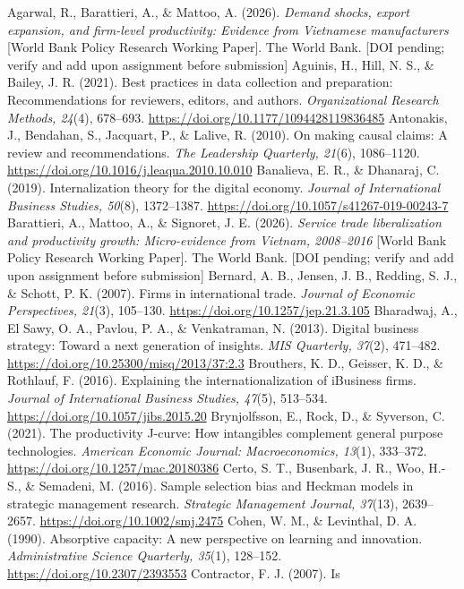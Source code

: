 \documentclass[12pt,a4paper]{article}
\begin{document}
Agarwal, R., Barattieri, A., \& Mattoo, A. (2026). \emph{Demand shocks,
export expansion, and firm-level productivity: Evidence from Vietnamese
manufacturers} {[}World Bank Policy Research Working Paper{]}. The World
Bank. {[}DOI pending; verify and add upon assignment before
submission{]} Aguinis, H., Hill, N. S., \& Bailey, J. R. (2021). Best
practices in data collection and preparation: Recommendations for
reviewers, editors, and authors. \emph{Organizational Research Methods,
24}(4), 678--693. \url{https://doi.org/10.1177/1094428119836485}
Antonakis, J., Bendahan, S., Jacquart, P., \& Lalive, R. (2010). On
making causal claims: A review and recommendations. \emph{The Leadership
Quarterly, 21}(6), 1086--1120.
\url{https://doi.org/10.1016/j.leaqua.2010.10.010} Banalieva, E. R., \&
Dhanaraj, C. (2019). Internalization theory for the digital economy.
\emph{Journal of International Business Studies, 50}(8), 1372--1387.
\url{https://doi.org/10.1057/s41267-019-00243-7} Barattieri, A., Mattoo,
A., \& Signoret, J. E. (2026). \emph{Service trade liberalization and
productivity growth: Micro-evidence from Vietnam, 2008--2016} {[}World
Bank Policy Research Working Paper{]}. The World Bank. {[}DOI pending;
verify and add upon assignment before submission{]} Bernard, A. B.,
Jensen, J. B., Redding, S. J., \& Schott, P. K. (2007). Firms in
international trade. \emph{Journal of Economic Perspectives, 21}(3),
105--130. \url{https://doi.org/10.1257/jep.21.3.105} Bharadwaj, A., El
Sawy, O. A., Pavlou, P. A., \& Venkatraman, N. (2013). Digital business
strategy: Toward a next generation of insights. \emph{MIS Quarterly,
37}(2), 471--482. \url{https://doi.org/10.25300/misq/2013/37:2.3}
Brouthers, K. D., Geisser, K. D., \& Rothlauf, F. (2016). Explaining the
internationalization of iBusiness firms. \emph{Journal of International
Business Studies, 47}(5), 513--534.
\url{https://doi.org/10.1057/jibs.2015.20} Brynjolfsson, E., Rock, D.,
\& Syverson, C. (2021). The productivity J-curve: How intangibles
complement general purpose technologies. \emph{American Economic
Journal: Macroeconomics, 13}(1), 333--372.
\url{https://doi.org/10.1257/mac.20180386} Certo, S. T., Busenbark, J.
R., Woo, H.-S., \& Semadeni, M. (2016). Sample selection bias and
Heckman models in strategic management research. \emph{Strategic
Management Journal, 37}(13), 2639--2657.
\url{https://doi.org/10.1002/smj.2475} Cohen, W. M., \& Levinthal, D. A.
(1990). Absorptive capacity: A new perspective on learning and
innovation. \emph{Administrative Science Quarterly, 35}(1), 128--152.
\url{https://doi.org/10.2307/2393553} Contractor, F. J. (2007). Is
\end{document}
